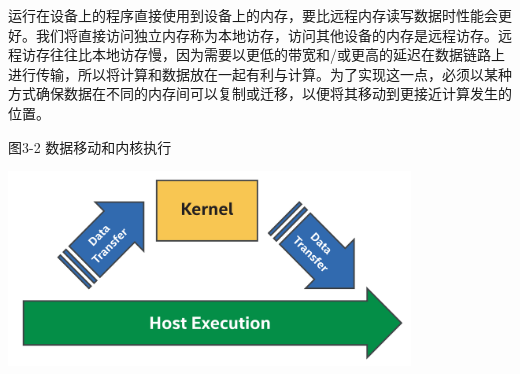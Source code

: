 运行在设备上的程序直接使用到设备上的内存，要比远程内存读写数据时性能会更好。我们将直接访问独立内存称为本地访存，访问其他设备的内存是远程访存。远程访存往往比本地访存慢，因为需要以更低的带宽和/或更高的延迟在数据链路上进行传输，所以将计算和数据放在一起有利与计算。为了实现这一点，必须以某种方式确保数据在不同的内存间可以复制或迁移，以便将其移动到更接近计算发生的位置。\par

\hspace*{\fill} \par %
图3-2 数据移动和内核执行
\begin{center}
	\includegraphics[width=0.8\textwidth]{content/chapter-3/images/3}
\end{center}